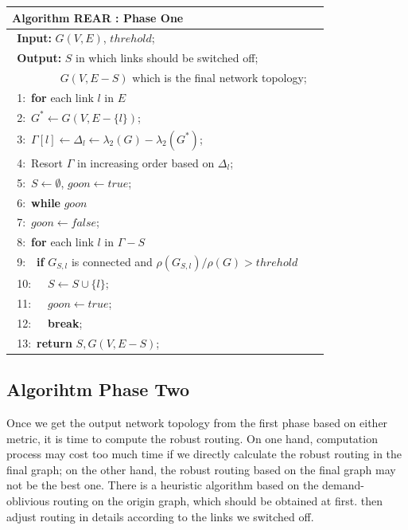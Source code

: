 \documentclass[conference]{IEEEtran}
\begin{document}
\begin{table}[!th]
\begin{tabular}{ll}
\hline
\textbf{Algorithm REAR : Phase One}\\
\hline
$\:\:$\textbf{Input:} $G(V, E)$, $threhold$;\\
$\:\:$\textbf{Output:} $S$ in which links should be switched off;\\
$\quad\qquad\quad$ $G(V, E-S)$ which is the final network topology;\\
$\:\:$1:\ \textbf{for} {each link $l$ in $E$}\\
$\:\:$2:\quad\ $G^* \leftarrow G(V, E-\{l\})$;\\
$\:\:$3:\quad\ $\Gamma[l] \leftarrow \Delta_l \leftarrow \lambda_2(G) - \lambda_2(G^*)$;\\
$\:\:$4:\ Resort $\Gamma$ in increasing order based on $\Delta_l$;\\
$\:\:$5:\ $S \leftarrow \emptyset$, $goon \leftarrow true$;\\
$\:\:$6:\ \textbf{while} {$goon$}\\
$\:\:$7:\quad\  $goon \leftarrow false$;\\
$\:\:$8:\quad\ \textbf{for} {each link $l$ in $\Gamma - S$}\\
$\:\:$9:\quad\ \quad\ \textbf{if} $G_{S,l}$ is connected and $\rho(G_{S,l})/\rho(G)>threhold$\\
$\:\:$10:\quad\ \quad\ \quad\ $S \leftarrow S \cup \{l\}$;\\
$\:\:$11:\quad\ \quad\ \quad\ $goon \leftarrow true$;\\
$\:\:$12:\quad\ \quad\ \quad\ \textbf{break};\\
$\:\:$13:\ \textbf{return} $S, G(V, E-S)$;\\
\hline
\end{tabular}
\end{table}



\subsection{Algorihtm Phase Two}
Once we get the output network topology from the first phase based on either metric, it is time to compute
the robust routing. On one hand, computation process may cost too much time if we directly calculate the robust routing in 
the final graph; on the other hand, the robust routing based on the final graph may not be the best one.
There is a heuristic algorithm
based on the demand-oblivious routing on the origin graph, which should be obtained at first.
then adjust routing in details according to the links we switched off.
\end{document}
